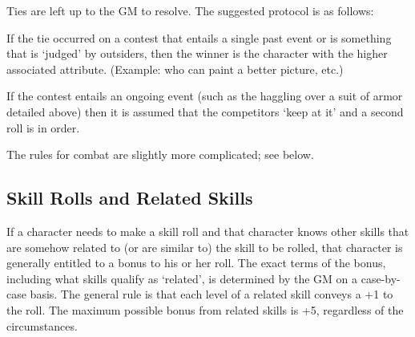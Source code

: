 \documentclass[twoside]{book}
\begin{document}
    {  
     Ties are left up to the GM to resolve. The suggested
               protocol is as follows: 
    }
  
    {  
     If the tie occurred on a contest that entails a
               single past event or is something that is
               `judged' by outsiders, then the winner is the
               character with the higher associated attribute. (Example:
               who can paint a better picture, etc.) 
    }
  
    {  
     If the contest entails an ongoing event (such as the
               haggling over a suit of armor detailed above) then it is
               assumed that the competitors `keep at it' and
               a second roll is in order. 
    }
  
    {  
     The rules for combat are slightly more complicated;
               see below. 
    }
  
    

\subsection{Skill Rolls and Related Skills}
    
    {  
     If a character needs to make a skill roll and that
               character knows other skills that are somehow related to
               (or are similar to) the skill to be rolled, that character
               is generally entitled to a bonus to his or her roll. The
               exact terms of the bonus, including what skills qualify as
               `related', is determined by the GM on a
               case-by-case basis. The general rule is that each level of
               a related skill conveys a +1 to the roll. The maximum
               possible bonus from related skills is +5, regardless of
               the circumstances. 
    }
  
  

  
\end{document}
